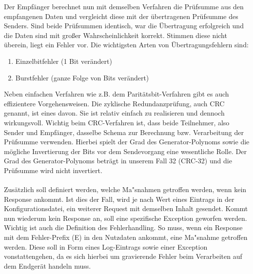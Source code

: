 Der Empfänger berechnet nun mit demselben Verfahren die Prüfsumme aus den empfangenen Daten und vergleicht diese mit der übertragenen Prüfsumme des Senders.
Sind beide Prüfsummen identisch, war die Übertragung erfolgreich und die Daten sind mit großer Wahrscheinlichkeit korrekt.
Stimmen diese nicht überein, liegt ein Fehler vor.
Die wichtigsten Arten von Übertragungsfehlern sind:
\begin{enumerate}
    \item Einzelbitfehler (1 Bit verändert)
    \item Burstfehler (ganze Folge von Bits verändert)
\end{enumerate}
Neben einfachen Verfahren wie z.B. dem Paritätsbit-Verfahren gibt es auch effizientere Vorgehensweisen.
Die zyklische Redundanzprüfung, auch CRC genannt, ist eines davon.
Sie ist relativ einfach zu realisieren und dennoch wirkungsvoll.
Wichtig beim CRC-Verfahren ist, dass beide Teilnehmer, also Sender und Empfänger, dasselbe Schema zur Berechnung bzw. Verarbeitung der Prüfsumme verwenden.
Hierbei spielt der Grad des Generator-Polynoms sowie die mögliche Invertierung der Bits vor dem Sendevorgang eine wesentliche Rolle.
Der Grad des Generator-Polynoms beträgt in unserem Fall 32 (CRC-32) und die Prüfsumme wird nicht invertiert.\\\\
Zusätzlich soll definiert werden, welche Ma"snahmen getroffen werden, wenn kein Response ankommt.
Ist dies der Fall, wird je nach Wert eines Eintrags in der Konfigurationsdatei, ein weiterer Request mit demselben Inhalt gesendet.
Kommt nun wiederum kein Response an, soll eine spezifische Exception geworfen werden.\\
Wichtig ist auch die Definition des Fehlerhandling.
So muss, wenn ein Response mit dem Fehler-Prefix (E) in den Nutzdaten ankommt, eine Ma"snahme getroffen werden.
Diese soll in Form eines Log-Eintrags sowie einer Exception vonstattengehen, da es sich hierbei um gravierende Fehler beim Verarbeiten auf dem Endgerät handeln muss.
